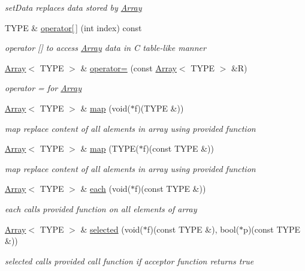 \begin{DoxyCompactItemize}
\begin{DoxyCompactList}\small\item\em set\+Data replaces data stored by \hyperlink{classArray}{Array} \end{DoxyCompactList}\item 
T\+Y\+P\+E \& \hyperlink{classArray_a87ffb65623ab72521ebe02547d9f01ff}{operator\mbox{[}$\,$\mbox{]}} (int index) const 
\begin{DoxyCompactList}\small\item\em operator \mbox{[}\mbox{]} to access \hyperlink{classArray}{Array} data in C table-\/like manner \end{DoxyCompactList}\item 
\hyperlink{classArray}{Array}$<$ T\+Y\+P\+E $>$ \& \hyperlink{classArray_a34e9893e307bf2fb22cab46290745c0a}{operator=} (const \hyperlink{classArray}{Array}$<$ T\+Y\+P\+E $>$ \&R)
\begin{DoxyCompactList}\small\item\em operator = for \hyperlink{classArray}{Array} \end{DoxyCompactList}\item 
\hyperlink{classArray}{Array}$<$ T\+Y\+P\+E $>$ \& \hyperlink{classArray_a0899406e957a31785920f60b046cd20c}{map} (void($\ast$f)(T\+Y\+P\+E \&))
\begin{DoxyCompactList}\small\item\em map replace content of all alements in array using provided function \end{DoxyCompactList}\item 
\hyperlink{classArray}{Array}$<$ T\+Y\+P\+E $>$ \& \hyperlink{classArray_a77b9fc51577ae9f1de00114fa73a6d71}{map} (T\+Y\+P\+E($\ast$f)(const T\+Y\+P\+E \&))
\begin{DoxyCompactList}\small\item\em map replace content of all alements in array using provided function \end{DoxyCompactList}\item 
\hyperlink{classArray}{Array}$<$ T\+Y\+P\+E $>$ \& \hyperlink{classArray_a4c4664880f4da94ebc7e7f42b15bc623}{each} (void($\ast$f)(const T\+Y\+P\+E \&))
\begin{DoxyCompactList}\small\item\em each calls provided function on all elements of array \end{DoxyCompactList}\item 
\hyperlink{classArray}{Array}$<$ T\+Y\+P\+E $>$ \& \hyperlink{classArray_ab23349c296b04fa2276a0996854ec9c7}{selected} (void($\ast$f)(const T\+Y\+P\+E \&), bool($\ast$p)(const T\+Y\+P\+E \&))
\begin{DoxyCompactList}\small\item\em selected calls provided call function if acceptor function returns true \end{DoxyCompactList}\end{DoxyCompactItemize}


